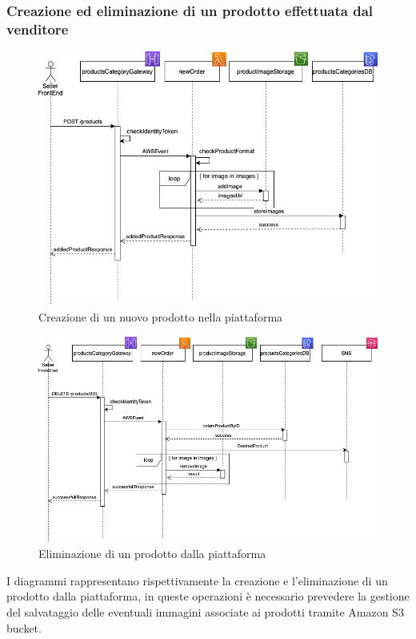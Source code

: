 \subsubsection{Creazione ed eliminazione di un prodotto effettuata dal venditore}
\begin{figure}[H]
	\centering
	\includegraphics[scale=0.5]{Immagini/Backend/CreazioneProdotto.png}
	\caption{Creazione di un nuovo prodotto nella piattaforma}
	\label{fig:DiagrammaCreazioneProdotto}
\end{figure}
\begin{figure}[H]
	\centering
	\includegraphics[scale=0.47]{Immagini/Backend/EliminazioneProdotto.png}
	\caption{Eliminazione di un prodotto dalla piattaforma}
	\label{fig:DiagrammiEliminazioneProdotto}
\end{figure}
I diagrammi rappresentano rispettivamente la creazione e l'eliminazione di un prodotto dalla piattaforma, in queste operazioni è necessario prevedere la gestione del salvataggio delle eventuali immagini associate ai prodotti tramite Amazon S3 bucket.
